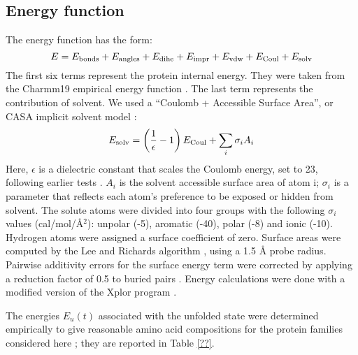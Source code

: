 \subsection{Energy function}
The energy function has the form:
\begin{equation} \label{eq:energy}
E = E_{\rm bonds} + E_{\rm angles} + E_{\rm dihe} + E_{\rm impr} + E_{\rm vdw} + E_{\rm Coul} + E_{\rm solv} 
\end{equation}
The first six terms represent the protein internal energy. They were taken from the Charmm19 empirical energy function \cite{Charmm}. The last term represents the contribution of solvent. We used a ``Coulomb + Accessible Surface Area'', or CASA implicit solvent model \cite{Lopes07,Schmidt08b}:
\begin{equation} \label{eq:casa}
E_{\rm solv} = \left( \frac{1}{\epsilon} -1 \right) E_{\rm Coul} + \sum_i \sigma_i A_i
\end{equation}
Here, $\epsilon$ is a dielectric constant that scales the Coulomb energy, set to 23, following earlier tests \cite{Schmidt08b}. $A_i$ is the solvent accessible surface area of atom i; $\sigma_i$ is a parameter that reflects each atom's preference to be exposed or hidden from solvent. The solute atoms were divided into four groups with the following $\sigma_i$ values (cal/mol/\AA$^2$): unpolar (-5), aromatic (-40), polar (-8) and ionic (-10). Hydrogen atoms were assigned a surface coefficient of zero. Surface areas were computed by the Lee and Richards algorithm \cite{Lee71}, using a 1.5 {\AA} probe radius. Pairwise additivity errors for the surface energy term were corrected by applying a reduction factor of 0.5 to buried pairs \cite{Street98,Lopes07}. Energy calculations were done with a modified version of the Xplor program \cite{Xplor,Simonson13b}.

The energies $E_u(t)$ associated with the unfolded state were determined empirically to give reasonable amino acid compositions for the protein families considered here \cite{Schmidt08}; they are reported in Table \ref{??}.

